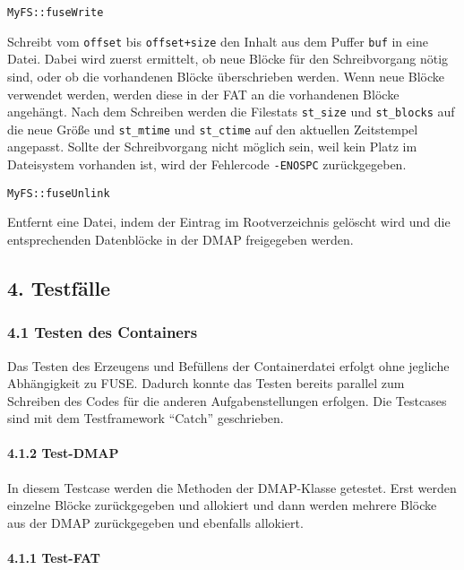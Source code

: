 \documentclass[]{article}
\let\oldparagraph\paragraph
\renewcommand{\paragraph}[1]{\oldparagraph{#1}\mbox{}}
\begin{document}
\texttt{MyFS::fuseWrite}

Schreibt vom \texttt{offset} bis \texttt{offset+size} den Inhalt aus dem
Puffer \texttt{buf} in eine Datei. Dabei wird zuerst ermittelt, ob neue
Blöcke für den Schreibvorgang nötig sind, oder ob die vorhandenen Blöcke
überschrieben werden. Wenn neue Blöcke verwendet werden, werden diese in
der FAT an die vorhandenen Blöcke angehängt. Nach dem Schreiben werden
die Filestats \texttt{st\_size} und \texttt{st\_blocks} auf die neue
Größe und \texttt{st\_mtime} und \texttt{st\_ctime} auf den aktuellen
Zeitstempel angepasst. Sollte der Schreibvorgang nicht möglich sein, weil
kein Platz im Dateisystem vorhanden ist, wird der Fehlercode
\texttt{-ENOSPC} zurückgegeben.

\texttt{MyFS::fuseUnlink}

Entfernt eine Datei, indem der Eintrag im Rootverzeichnis gelöscht wird
und die entsprechenden Datenblöcke in der DMAP freigegeben werden.

\hypertarget{testfuxe4lle}{%
\subsection{4. Testfälle}\label{testfuxe4lle}}

\hypertarget{testen-des-containers}{%
\subsubsection{4.1 Testen des Containers}\label{testen-des-containers}}

Das Testen des Erzeugens und
Befüllens der Containerdatei erfolgt ohne jegliche Abhängigkeit zu FUSE.
Dadurch konnte das Testen bereits parallel zum Schreiben des Codes für
die anderen Aufgabenstellungen erfolgen. Die Testcases sind mit dem
Testframework ``Catch'' geschrieben.

\hypertarget{test-dmap}{%
\paragraph{4.1.2 Test-DMAP}\label{test-dmap}}

In diesem Testcase werden die Methoden der DMAP-Klasse getestet. Erst werden einzelne Blöcke zurückgegeben und allokiert und dann
werden mehrere Blöcke aus der DMAP zurückgegeben und ebenfalls allokiert.

\hypertarget{test-fat}{%
\paragraph{4.1.1 Test-FAT}\label{test-fat}}
\end{document}
